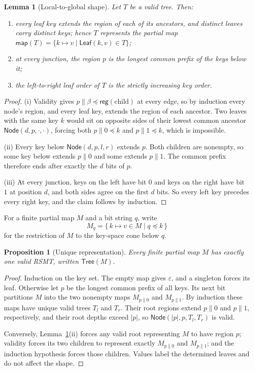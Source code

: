 \documentclass[twocolumn]{article}
\newtheorem{proposition}{Proposition}
\newtheorem{lemma}{Lemma}
\begin{document}
\begin{lemma}[Local-to-global shape]
\label{lem:shape}
Let $T$ be a valid tree. Then:
\begin{enumerate}[nosep,label=(\roman*)]
  \item every leaf key extends the region of each of its ancestors, and distinct leaves carry distinct keys; hence $T$ represents the partial map $\mathsf{map}(T) = \{k \mapsto v \mid \mathsf{Leaf}(k,v) \in T\}$;
  \item at every junction, the region $p$ is the longest common prefix of the keys below it;
  \item the left-to-right leaf order of $T$ is the strictly increasing key order.
\end{enumerate}
\end{lemma}
\begin{proof}
(i) Validity gives $p\|\beta \preceq \mathsf{reg}(\text{child})$ at every edge, so by induction every node's region, and every leaf key, extends the region of each ancestor. Two leaves with the same key $k$ would sit on opposite sides of their lowest common ancestor $\mathsf{Node}(d,p,\cdot,\cdot)$, forcing both $p\|0 \preceq k$ and $p\|1 \preceq k$, which is impossible.

(ii) Every key below $\mathsf{Node}(d,p,l,r)$ extends $p$. Both children are nonempty, so some key below extends $p\|0$ and some extends $p\|1$. The common prefix therefore ends after exactly the $d$ bits of $p$.

(iii) At every junction, keys on the left have bit $0$ and keys on the right have bit $1$ at position $d$, and both sides agree on the first $d$ bits. So every left key precedes every right key, and the claim follows by induction.
\end{proof}

For a finite partial map $M$ and a bit string $q$, write
\[
  M_q = \{\,k \mapsto v \in M \mid q \preceq k\,\}
\]
for the restriction of $M$ to the key-space cone below $q$.

\begin{proposition}[Unique representation]
\label{prop:unique}
Every finite partial map $M$ has exactly one valid RSMT, written $\mathsf{Tree}(M)$.
\end{proposition}
\begin{proof}
Induction on the key set. The empty map gives $\varepsilon$, and a singleton forces its leaf. Otherwise let $p$ be the longest common prefix of all keys. Its next bit partitions $M$ into the two nonempty maps $M_{p\|0}$ and $M_{p\|1}$. By induction these maps have unique valid trees $T_l$ and $T_r$. Their root regions extend $p\|0$ and $p\|1$, respectively, and their root depths exceed $|p|$, so $\mathsf{Node}(|p|,p,T_l,T_r)$ is valid.

Conversely, Lemma~\ref{lem:shape}(ii) forces any valid root representing $M$ to have region $p$; validity forces its two children to represent exactly $M_{p\|0}$ and $M_{p\|1}$; and the induction hypothesis forces those children. Values label the determined leaves and do not affect the shape.
\end{proof}
\end{document}
